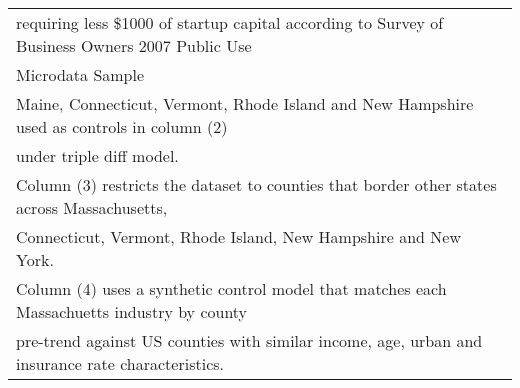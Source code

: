 {\begin{tabular}{l*{4}{c}}
\multicolumn{5}{l}{\footnotesize \space requiring less \$1000 of startup capital according to Survey of Business Owners 2007 Public Use }\\
\multicolumn{5}{l}{\footnotesize \space Microdata Sample }\\
\multicolumn{5}{l}{\footnotesize Maine, Connecticut, Vermont, Rhode Island and New Hampshire used as controls in column (2) }\\
\multicolumn{5}{l}{\footnotesize \space under triple diff model. }\\
\multicolumn{5}{l}{\footnotesize Column (3) restricts the dataset to counties that border other states across Massachusetts, }\\
\multicolumn{5}{l}{\footnotesize \space Connecticut, Vermont, Rhode Island, New Hampshire and New York. }\\
\multicolumn{5}{l}{\footnotesize Column (4) uses a synthetic control model that matches each Massachuetts industry by county }\\
\multicolumn{5}{l}{\footnotesize \space pre-trend against US counties with similar income, age, urban and insurance rate characteristics. }\\
\end{tabular}
}
